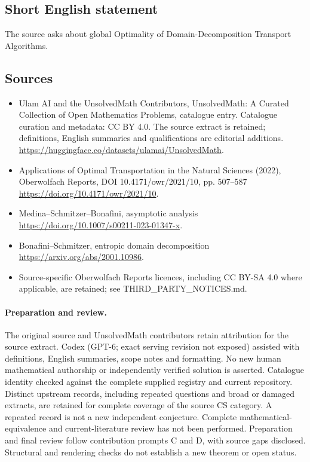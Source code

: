 \documentclass[11pt]{article}
\begin{document}
\subsection{Short English statement}
The source asks about global Optimality of Domain-Decomposition Transport Algorithms.
\subsection{Sources}
\begin{itemize}
\item[\hypertarget{source:statement:1}{S1}] Ulam AI and the UnsolvedMath Contributors, UnsolvedMath: A Curated Collection of Open Mathematics Problems, catalogue entry. Catalogue curation and metadata: CC BY 4.0. The source extract is retained; definitions, English summaries and qualifications are editorial additions.
\url{https://huggingface.co/datasets/ulamai/UnsolvedMath}.
\item[\hypertarget{source:statement:2}{S2}] Applications of Optimal Transportation in the Natural Sciences (2022), Oberwolfach Reports, DOI 10.4171/owr/2021/10, pp. 507--587
\url{https://doi.org/10.4171/owr/2021/10}.
\item[\hypertarget{source:statement:3}{S3}] Medina--Schmitzer--Bonafini, asymptotic analysis
\url{https://doi.org/10.1007/s00211-023-01347-x}.
\item[\hypertarget{source:statement:4}{S4}] Bonafini--Schmitzer, entropic domain decomposition
\url{https://arxiv.org/abs/2001.10986}.
\item Source-specific Oberwolfach Reports licences, including CC BY-SA 4.0 where applicable, are retained; see THIRD\_PARTY\_NOTICES.md.
\end{itemize}
\paragraph{Preparation and review.}
The original source and UnsolvedMath contributors retain attribution for the source extract. Codex (GPT-6; exact serving revision not exposed) assisted with definitions, English summaries, scope notes and formatting. No new human mathematical authorship or independently verified solution is asserted. Catalogue identity checked against the complete supplied registry and current repository. Distinct upstream records, including repeated questions and broad or damaged extracts, are retained for complete coverage of the source CS category. A repeated record is not a new independent conjecture. Complete mathematical-equivalence and current-literature review has not been performed. Preparation and final review follow contribution prompts C and D, with source gaps disclosed. Structural and rendering checks do not establish a new theorem or open status.
\label{end:statement}
\end{document}
